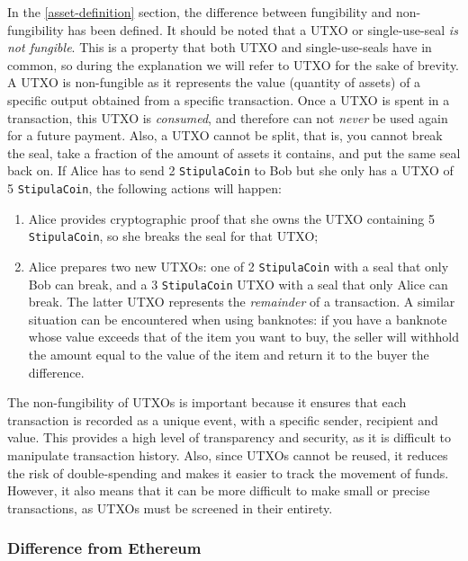 In the \ref{asset-definition} section, the difference between fungibility and non-fungibility has been 
defined. It should be noted that a UTXO or single-use-seal \textit{is not fungible}. This is a property that 
both UTXO and single-use-seals have in common, so during the explanation we will refer to UTXO for the sake 
of brevity. A UTXO is non-fungible as it represents the value (quantity of assets) of a specific output 
obtained from a specific transaction. Once a UTXO is spent in a transaction, this UTXO is \textit{consumed}, 
and therefore can not \textit{never} be used again for a future payment. Also, a UTXO cannot be split, that 
is, you cannot break the seal, take a fraction of the amount of assets it contains, and put the same seal 
back on. If Alice has to send 2 \verb|StipulaCoin| to Bob but she only has a UTXO of 5 \verb|StipulaCoin|, 
the following actions will happen:
\begin{enumerate}
	\item Alice provides cryptographic proof that she owns the UTXO containing 5 \verb|StipulaCoin|, so she 
	breaks the seal for that UTXO;
	\item Alice prepares two new UTXOs: one of 2 \verb|StipulaCoin| with a seal that only Bob can break, and 
	a 3 \verb|StipulaCoin| UTXO with a seal that only Alice can break. The latter UTXO represents the 
	\textit{remainder} of a transaction. A similar situation can be encountered when using banknotes: if you have a banknote whose value exceeds that of the item you want to buy, the seller will withhold the amount equal to the value of the item and return it to the buyer the difference.
\end{enumerate}

The non-fungibility of UTXOs is important because it ensures that each transaction is recorded as a unique 
event, with a specific sender, recipient and value. This provides a high level of transparency and security, 
as it is difficult to manipulate transaction history. Also, since UTXOs cannot be reused, it reduces the 
risk of double-spending and makes it easier to track the movement of funds. However, it also means that it 
can be more difficult to make small or precise transactions, as UTXOs must be screened in their entirety.

\subsubsection{Difference from Ethereum}

